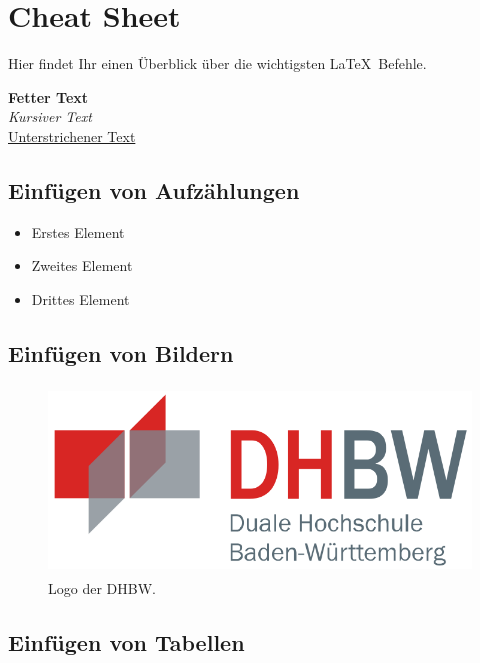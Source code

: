 \chapter{Cheat Sheet}\label{chapter:cheat_sheet}

Hier findet Ihr einen Überblick über die wichtigsten \LaTeX\ Befehle.

\textbf{Fetter Text} \\
\textit{Kursiver Text} \\
\underline{Unterstrichener Text} \\

\section{Einfügen von Aufzählungen}\label{section:aufzaehlungen}

    \begin{itemize}
        \item Erstes Element
        \item Zweites Element
        \item Drittes Element
    \end{itemize}

\section{Einfügen von Bildern}\label{section:bilder}

    \begin{figure}[htb]
        \centering
        \includegraphics[height=5cm]{graphics/dhbw.png}
        \caption[Logo der DHBW]{Logo der DHBW.\footnotemark}
        \label{abb:DHBWLogo}
    \end{figure}

\section{Einfügen von Tabellen}\label{section:tabellen}

